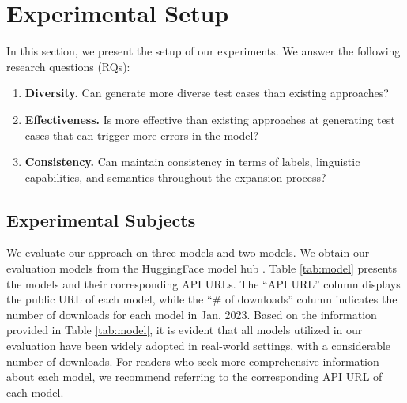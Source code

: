 \section{Experimental Setup}
\label{sec:experiment}


In this section, we present the setup of our experiments. We answer the following research questions (RQs):

\begin{enumerate}[label=\textbf{RQ\arabic*}]
    \item \label{rq:one} \textbf{Diversity.} Can \tool generate more diverse test cases than existing approaches?
    
    \item \label{rq:two} \textbf{Effectiveness.} Is \tool more effective than existing approaches at generating test cases that can trigger more errors in the model?
    
    
    
    \item \label{rq:three}  \textbf{Consistency.} Can \tool maintain consistency in terms of labels, linguistic capabilities, and semantics throughout the expansion process?
    
    
\end{enumerate}




\subsection{Experimental Subjects}
 We evaluate our approach on three \sa models and two \hsd models.  We obtain our evaluation models from the HuggingFace model hub \cite{huggingface}.
Table \ref{tab:model} presents the models and their corresponding API URLs. The ``API URL'' column displays the public URL of each model, while the ``$\#$ of downloads'' column indicates the number of downloads for each model in Jan. 2023. Based on the information provided in Table \ref{tab:model}, it is evident that all models utilized in our evaluation have been widely adopted in real-world settings, with a considerable number of downloads. 
For readers who seek more comprehensive information about each model, we recommend referring to the corresponding API URL of each model.

